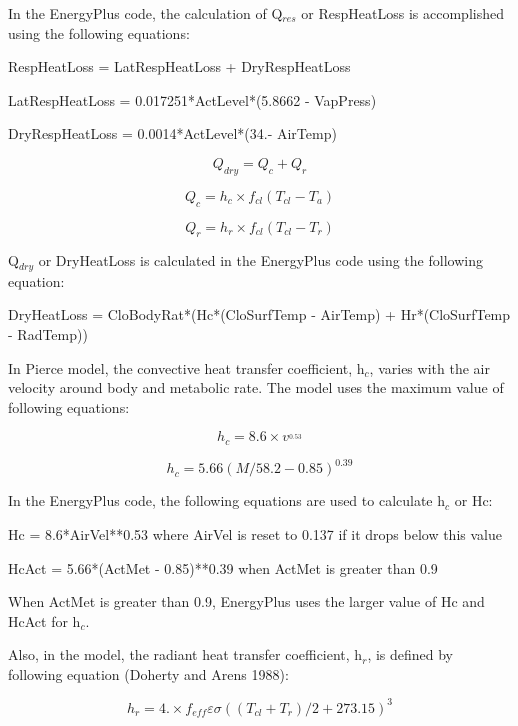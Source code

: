 In the EnergyPlus code, the calculation of Q\(_{res}\) or RespHeatLoss is accomplished using the following equations:

RespHeatLoss = LatRespHeatLoss + DryRespHeatLoss

LatRespHeatLoss = 0.017251*ActLevel*(5.8662 - VapPress)

DryRespHeatLoss = 0.0014*ActLevel*(34.- AirTemp)

\begin{equation}
{Q_{dry}} = {Q_c} + {Q_r}
\end{equation}

\begin{equation}
{Q_c} = {h_c} \times {f_{cl}}({T_{cl}} - {T_a})
\end{equation}

\begin{equation}
{Q_r} = {h_r} \times {f_{cl}}({T_{cl}} - {T_r})
\label{eq:PierceQr}
\end{equation}

Q\(_{dry}\) or DryHeatLoss is calculated in the EnergyPlus code using the following equation:

DryHeatLoss = CloBodyRat*(Hc*(CloSurfTemp - AirTemp) + Hr*(CloSurfTemp - RadTemp))

In Pierce model, the convective heat transfer coefficient, h\(_{c}\), varies with the air velocity around body and metabolic rate. The model uses the maximum value of following equations:

\begin{equation}
{h_c} = 8.6 \times {v^{_{0.53}}}
\end{equation}

\begin{equation}
{h_c} = 5.66{(M/58.2 - 0.85)^{0.39}}
\end{equation}

In the EnergyPlus code, the following equations are used to calculate h\(_{c}\) or Hc:

Hc = 8.6*AirVel**0.53 where AirVel is reset to 0.137 if it drops below this value

HcAct = 5.66*(ActMet - 0.85)**0.39 when ActMet is greater than 0.9

When ActMet is greater than 0.9, EnergyPlus uses the larger value of Hc and HcAct for h\(_{c}\).

Also, in the model, the radiant heat transfer coefficient, h\(_{r}\), is defined by following equation (Doherty and Arens 1988):

\begin{equation}
{h_r} = 4. \times {f_{eff}}\varepsilon \sigma {(({T_{cl}} + {T_r})/2 + 273.15)^3}
\end{equation}

